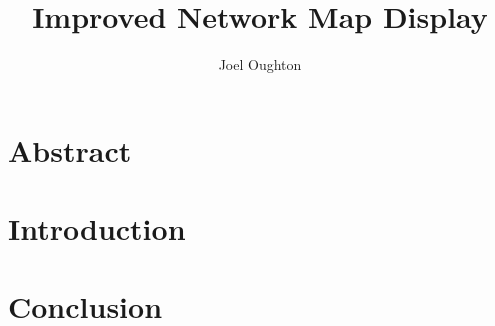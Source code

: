 \documentclass{article}
\title{Improved Network Map Display}
\author{Joel Oughton}
\date{}
\begin{document}
\maketitle

\section{Abstract}
\label{sec:abstract}

\section{Introduction}
\label{sec:introduction}

\section{Conclusion}
\label{sec:conclusion}



\end{document}
